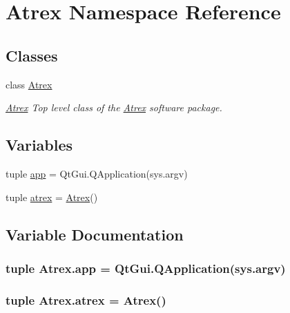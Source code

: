 \hypertarget{namespace_atrex}{\section{Atrex Namespace Reference}
\label{namespace_atrex}
}
\subsection*{Classes}
\begin{DoxyCompactItemize}
\item 
class \hyperlink{class_atrex_1_1_atrex}{Atrex}
\begin{DoxyCompactList}\small\item\em \hyperlink{class_atrex_1_1_atrex}{Atrex} Top level class of the \hyperlink{class_atrex_1_1_atrex}{Atrex} software package. \end{DoxyCompactList}\end{DoxyCompactItemize}
\subsection*{Variables}
\begin{DoxyCompactItemize}
\item 
tuple \hyperlink{namespace_atrex_afb58c624b98f7c5df49888bb198f1374}{app} = Qt\-Gui.\-Q\-Application(sys.\-argv)
\item 
tuple \hyperlink{namespace_atrex_a1af4daf409e7f1e23d2ff5a8352f4da1}{atrex} = \hyperlink{class_atrex_1_1_atrex}{Atrex}()
\end{DoxyCompactItemize}


\subsection{Variable Documentation}
\hypertarget{namespace_atrex_afb58c624b98f7c5df49888bb198f1374}{
\subsubsection[{app}]{\setlength{\rightskip}{0pt plus 5cm}tuple Atrex.\-app = Qt\-Gui.\-Q\-Application(sys.\-argv)}}\label{namespace_atrex_afb58c624b98f7c5df49888bb198f1374}
\hypertarget{namespace_atrex_a1af4daf409e7f1e23d2ff5a8352f4da1}{
\subsubsection[{atrex}]{\setlength{\rightskip}{0pt plus 5cm}tuple Atrex.\-atrex = {\bf Atrex}()}}\label{namespace_atrex_a1af4daf409e7f1e23d2ff5a8352f4da1}
